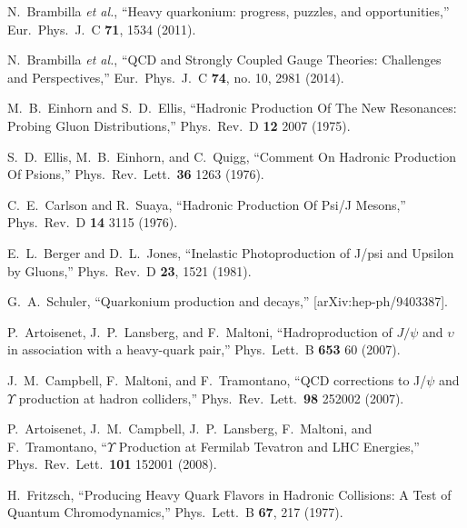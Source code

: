 \documentclass[12pt,a4paper,final]{iopart}
\begin{document}
\begin{thebibliography}{100}
  N.~Brambilla {\it et al.},
  ``Heavy quarkonium: progress, puzzles, and opportunities,''
  Eur.\ Phys.\ J.\ C {\bf 71}, 1534 (2011).


  N.~Brambilla {\it et al.},
  ``QCD and Strongly Coupled Gauge Theories: Challenges and Perspectives,''
  Eur.\ Phys.\ J.\ C {\bf 74}, no. 10, 2981 (2014).



  M.~B.~Einhorn and S.~D.~Ellis,
  ``Hadronic Production Of The New Resonances: Probing Gluon Distributions,''
  Phys.\ Rev.\  D {\bf 12} 2007 (1975).

  S.~D.~Ellis, M.~B.~Einhorn, and C.~Quigg,
  ``Comment On Hadronic Production Of Psions,''
  Phys.\ Rev.\ Lett.\  {\bf 36} 1263 (1976).

  C.~E.~Carlson and R.~Suaya,
  ``Hadronic Production Of Psi/J Mesons,''
  Phys.\ Rev.\  D {\bf 14} 3115 (1976).
  
  E.~L.~Berger and D.~L.~Jones,
  ``Inelastic Photoproduction of J/psi and Upsilon by Gluons,''
  Phys.\ Rev.\ D {\bf 23}, 1521 (1981).

  G.~A.~Schuler,        
  ``Quarkonium production and decays,''
  [arXiv:hep-ph/9403387].


  P.~Artoisenet, J.~P.~Lansberg, and F.~Maltoni,
  ``Hadroproduction of $J/\psi$ and $\upsilon$ in association with a
  heavy-quark pair,''
  Phys.\ Lett.\  B {\bf 653} 60 (2007).


  J.~M.~Campbell, F.~Maltoni, and F.~Tramontano,
  ``QCD corrections to J/$\psi$ and $\Upsilon$ production at hadron colliders,''
  Phys.\ Rev.\ Lett.\  {\bf 98} 252002 (2007).


  P.~Artoisenet, J.~M.~Campbell, J.~P.~Lansberg, F.~Maltoni, and F.~Tramontano,
  ``$\Upsilon$ Production at Fermilab Tevatron and LHC Energies,''
  Phys.\ Rev.\ Lett.\  {\bf 101} 152001 (2008).
  

  H.~Fritzsch,
  ``Producing Heavy Quark Flavors in Hadronic Collisions: A Test of Quantum Chromodynamics,''
  Phys.\ Lett.\ B {\bf 67}, 217 (1977).
  

\end{thebibliography}
\end{document}
